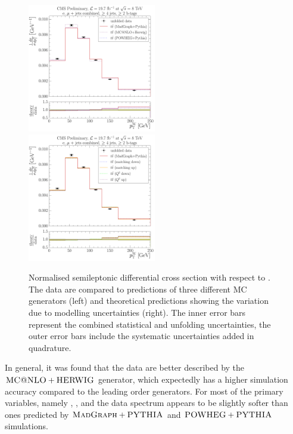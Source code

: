 \begin{figure}[!htbp]
	\centering
  	{\includegraphics[width=0.5\textwidth]{measurement/WPT/central/normalised_xsection_combined_different_generators}}\hfill
  	{\includegraphics[width=0.5\textwidth]{measurement/WPT/central/normalised_xsection_combined_systematics_shifts}}
    \caption[Normalised semileptonic \ttbar differential cross section with respect to \WPT]{Normalised semileptonic
      \ttbar differential cross section with respect to \WPT. The data are compared to predictions of three different MC
      generators (left) and theoretical predictions showing the variation due to modelling uncertainties (right). The
      inner error bars represent the combined statistical and unfolding uncertainties, the outer error bars include the
      systematic uncertainties added in quadrature.}
    \label{fig:results_WPT_combined}
\end{figure}

\newpage
In general, it was found that the data are better described by the $\textsc{MC@NLO}+{\textsc{HERWIG}}$ generator, which expectedly has a
higher simulation accuracy compared to the leading order generators. For most of the primary variables, namely \MET,
\ST, \HT and \WPT the data spectrum appears to be slightly softer than ones predicted by $\textsc{MadGraph}+{\textsc{PYTHIA}}$ and
${\textsc{POWHEG}}+{\textsc{PYTHIA}}$ simulations.

